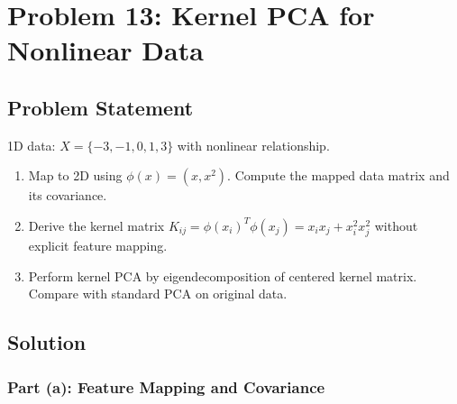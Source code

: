\documentclass[12pt]{article}
\begin{document}
\newpage
\section{Problem 13: Kernel PCA for Nonlinear Data}

\subsection{Problem Statement}

1D data: \(X = \{-3, -1, 0, 1, 3\}\) with nonlinear relationship.

\begin{enumerate}
\item[(a)] Map to 2D using \(\phi(x) = (x, x^2)\). Compute the mapped data matrix and its covariance.
\item[(b)] Derive the kernel matrix \(K_{ij} = \phi(x_i)^T\phi(x_j) = x_ix_j + x_i^2x_j^2\) without explicit feature mapping.
\item[(c)] Perform kernel PCA by eigendecomposition of centered kernel matrix. Compare with standard PCA on original data.
\end{enumerate}

\subsection{Solution}

\subsubsection{Part (a): Feature Mapping and Covariance}
\end{document}

